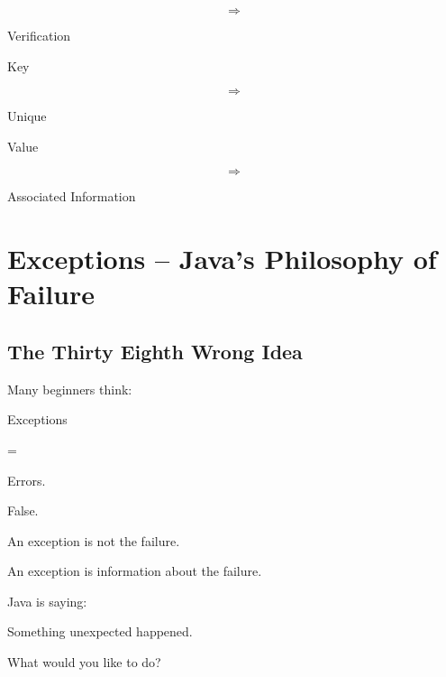 \documentclass[11pt,a4paper]{book}
\begin{document}
\[
\Rightarrow
\]

Verification


Key

\[
\Rightarrow
\]

Unique


Value

\[
\Rightarrow
\]

Associated Information

\chapter{Exceptions -- Java's Philosophy of Failure}

\section{The Thirty Eighth Wrong Idea}

\begin{trap}

Many beginners think:


Exceptions

=

Errors.


False.


An exception is not the failure.


An exception is information
about the failure.


Java is saying:


Something unexpected happened.

What would you like to do?


\end{trap}
\end{document}
